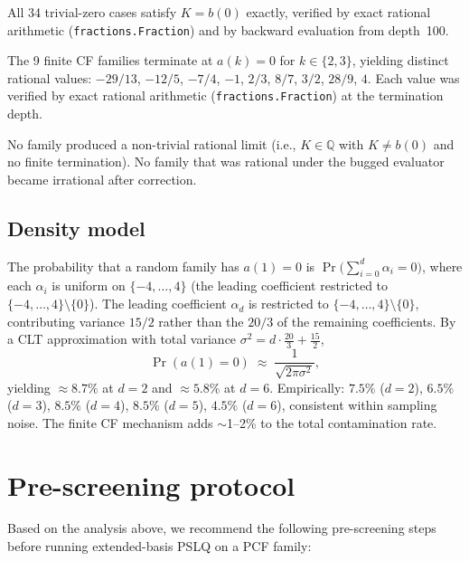 \documentclass[11pt]{amsart}
\theoremstyle{definition}
\theoremstyle{remark}
\begin{document}
All 34 trivial-zero cases satisfy $K = b(0)$ exactly, verified by
exact rational arithmetic (\texttt{fractions.Fraction}) and by
backward evaluation from depth~100.

The 9 finite CF families terminate at $a(k)=0$ for $k\in\{2,3\}$,
yielding distinct rational values: $-29/13$, $-12/5$, $-7/4$, $-1$,
$2/3$, $8/7$, $3/2$, $28/9$, $4$.
Each value was verified by exact rational arithmetic
(\texttt{fractions.Fraction}) at the termination depth.

No family produced a non-trivial rational limit (i.e., $K\in\mathbb{Q}$
with $K\ne b(0)$ and no finite termination).
No family that was rational under the bugged evaluator became
irrational after correction.

\subsection{Density model}\label{sec:density}

The probability that a random family has $a(1)=0$ is
$\Pr\!\bigl(\sum_{i=0}^d \alpha_i = 0\bigr)$, where each $\alpha_i$ is
uniform on $\{-4,\ldots,4\}$ (the leading coefficient restricted to
$\{-4,\ldots,4\}\setminus\{0\}$).
The leading coefficient $\alpha_d$ is restricted to
$\{-4,\ldots,4\}\setminus\{0\}$, contributing variance $15/2$
rather than the $20/3$ of the remaining coefficients.
By a CLT approximation with total variance $\sigma^2 = d\cdot\tfrac{20}{3}+\tfrac{15}{2}$,
\[
  \Pr(a(1)=0) \;\approx\; \frac{1}{\sqrt{2\pi\sigma^2}},
\]
yielding $\approx 8.7\%$ at $d=2$ and $\approx 5.8\%$ at $d=6$.
Empirically: $7.5\%$ ($d=2$), $6.5\%$ ($d=3$), $8.5\%$ ($d=4$),
$8.5\%$ ($d=5$), $4.5\%$ ($d=6$), consistent within sampling noise.
The finite CF mechanism adds $\sim$1--2\% to the total contamination rate.

\section{Pre-screening protocol}\label{sec:protocol}

Based on the analysis above, we recommend the following pre-screening
steps before running extended-basis PSLQ on a PCF family:
\end{document}
